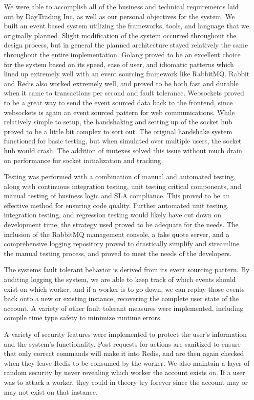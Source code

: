 \begin{Overview}
We were able to accomplish all of the business and technical requirements laid out by DayTrading Inc, as well as our personal objectives for the system. We built an event based system utilizing the frameworks, tools, and language that we originally planned. Slight modification of the system occurred throughout the design process, but in general the planned architecture stayed relatively the same throughout the entire implementation. Golang proved to be an excellent choice for the system based on its speed, ease of user, and idiomatic patterns which lined up extremely well with an event sourcing framework like RabbitMQ. Rabbit and Redis also worked extremely well, and proved to be both fast and durable when it came to transactions per second and fault tolerance. Websockets proved to be a great way to send the event sourced data back to the frontend, since websockets is again an event sourced pattern for web communications. While relatively simple to setup, the handshaking and setting up of the socket hub proved to be a little bit complex to sort out. The original handshake system functioned for basic testing, but when simulated over multiple users, the socket hub would crash. The addition of mutexes solved this issue without much drain on performance for socket initialization and tracking.

Testing was performed with a combination of manual and automated testing, along with continuous integration testing, unit testing critical components, and manual testing of business logic and SLA compliance. This proved to be an effective method for ensuring code quality.  Further automated unit testing, integration testing, and  regression testing would likely have cut down on development time, the strategy used proved to be adequate for the needs.  The inclusion of the RabbitMQ management console, a fake quote server, and a comprehensive logging repository proved to drastically simplify and streamline the manual testing process, and proved to meet the needs of the developers.

The systems fault tolerant behavior is derived from its event sourcing pattern. By auditing logging the system, we are able to keep track of which events should exist on which worker, and if a worker is to go down, we can replay those events back onto a new or existing instance, recovering the complete user state of the account. A variety of other fault tolerant measures were implemented, including compile time type safety to minimize runtime errors.

A variety of security features were implemented to protect the user's information and the system’s functionality. Post requests for actions are sanitized to ensure that only correct commands will make it into Redis, and are then again checked when they leave Redis to be consumed by the worker. We also maintain a layer of random security by never revealing which worker the account exists on. If a user was to attack a worker, they could in theory try forever since the account may or may not exist on that instance.


\end{Overview}
